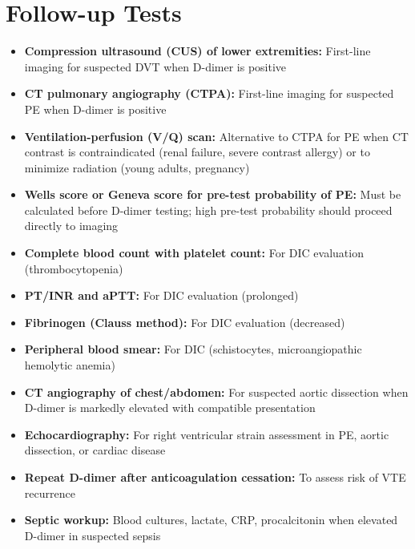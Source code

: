 \section*{Follow-up Tests}
\begin{itemize}
  \item \textbf{Compression ultrasound (CUS) of lower extremities:} First-line imaging for suspected DVT when D-dimer is positive
  \item \textbf{CT pulmonary angiography (CTPA):} First-line imaging for suspected PE when D-dimer is positive
  \item \textbf{Ventilation-perfusion (V/Q) scan:} Alternative to CTPA for PE when CT contrast is contraindicated (renal failure, severe contrast allergy) or to minimize radiation (young adults, pregnancy)
  \item \textbf{Wells score or Geneva score for pre-test probability of PE:} Must be calculated before D-dimer testing; high pre-test probability should proceed directly to imaging
  \item \textbf{Complete blood count with platelet count:} For DIC evaluation (thrombocytopenia)
  \item \textbf{PT/INR and aPTT:} For DIC evaluation (prolonged)
  \item \textbf{Fibrinogen (Clauss method):} For DIC evaluation (decreased)
  \item \textbf{Peripheral blood smear:} For DIC (schistocytes, microangiopathic hemolytic anemia)
  \item \textbf{CT angiography of chest/abdomen:} For suspected aortic dissection when D-dimer is markedly elevated with compatible presentation
  \item \textbf{Echocardiography:} For right ventricular strain assessment in PE, aortic dissection, or cardiac disease
  \item \textbf{Repeat D-dimer after anticoagulation cessation:} To assess risk of VTE recurrence
  \item \textbf{Septic workup:} Blood cultures, lactate, CRP, procalcitonin when elevated D-dimer in suspected sepsis
\end{itemize}

